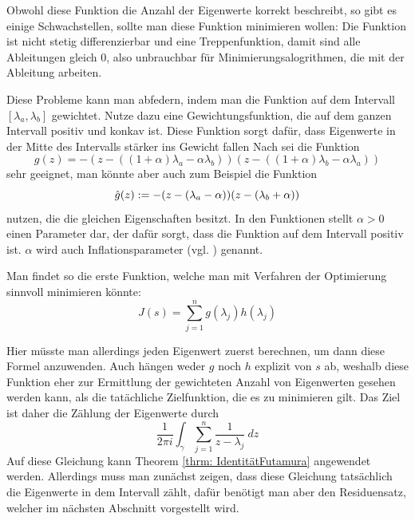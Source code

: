 \documentclass[a4paper,12pt]{report}
\newcommand{\zitat}[1]{\glqq #1\grqq}
\newcommand{\1}{\mathds{1}}
\theoremstyle{plain} %
\theoremstyle{definition} %
\theoremstyle{remark}
\begin{document}
            Obwohl diese Funktion die Anzahl der Eigenwerte korrekt beschreibt, so gibt es einige Schwachstellen, sollte man diese Funktion minimieren wollen:
            Die Funktion ist nicht stetig differenzierbar und eine Treppenfunktion, damit sind alle Ableitungen gleich 0, also unbrauchbar für Minimierungsalogrithmen, die mit der Ableitung arbeiten.

            Diese Probleme kann man abfedern, indem man die Funktion auf dem Intervall $[\lambda_a, \lambda_b]$ gewichtet.
            Nutze dazu eine Gewichtungsfunktion, die auf dem ganzen Intervall positiv und konkav ist.
            Diese Funktion sorgt dafür, dass Eigenwerte in der Mitte des Intervalls stärker ins Gewicht fallen
            Nach \cite[S. 3]{hauptteilTkachuk} sei die Funktion
            $$g(z) = -(z-((1+\alpha)\lambda_a -\alpha\lambda_b))(z-((1+\alpha)\lambda_b-\alpha\lambda_a))$$
            sehr geeignet, man könnte aber auch zum Beispiel die Funktion
            $$\Hat g(z) := -(z-(\lambda_a-\alpha))(z-(\lambda_b+\alpha))$$
            nutzen, die die gleichen Eigenschaften besitzt.
            In den Funktionen stellt $\alpha>0$ einen Parameter dar, der dafür sorgt, dass die Funktion auf dem Intervall positiv ist.
            $\alpha$ wird auch \zitat{Inflationsparameter} (vgl. \cite[S. 3]{hauptteilTkachuk}) genannt.

            Man findet so die erste Funktion, welche man mit Verfahren der Optimierung sinnvoll minimieren könnte:
            $$J(s) = \sum_{j=1}^n g(\lambda_j)h(\lambda_j)$$

            Hier müsste man allerdings jeden Eigenwert zuerst berechnen, um dann diese Formel anzuwenden.
            Auch hängen weder $g$ noch $h$ explizit von $s$ ab, weshalb diese Funktion eher zur Ermittlung der gewichteten Anzahl von Eigenwerten gesehen werden kann, als die tatächliche Zielfunktion, die es zu minimieren gilt.
            Das Ziel ist daher die Zählung der Eigenwerte durch
            \begin{equation}
                  \label{eqn: ZielfunktionMitPolstellen}
                  \frac 1 {2\pi i}\int_\gamma \sum_{j=1}^{n} \frac{1}{z-\lambda_j}\ dz
            \end{equation}
            Auf diese Gleichung kann Theorem \ref{thrm: IdentitätFutamura} angewendet werden.
            Allerdings muss man zunächst zeigen, dass diese Gleichung tatsächlich die Eigenwerte in dem Intervall zählt, dafür benötigt man aber den Residuensatz, welcher im nächsten Abschnitt vorgestellt wird.
\end{document}
